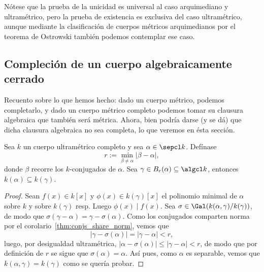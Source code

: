 \documentclass[teoria-numeros.tex]{subfiles}
\begin{document}
Nótese que la prueba de la unicidad es universal al caso arquimediano y ultramétrico, pero la prueba de existencia es exclusiva del caso ultramétrico,
aunque mediante la clasificación de cuerpos métricos arquimedianos por el teorema de Ostrowski también podemos contemplar ese caso.

\subsection{Compleción de un cuerpo algebraicamente cerrado}
Recuento sobre lo que hemos hecho: dado un cuerpo métrico, podemos completarlo, y dado un cuerpo métrico completo podemos tomar su clausura algebraica que
también será métrica. Ahora, bien podría darse (y se dá) que dicha clausura algebraica no sea completa, lo que veremos en ésta sección.

\begin{thm}
	Sea $k$ un cuerpo ultramétrico completo y sea $\alpha \in \sepcl k$. Defínase
	$$ r := \min_{\beta\ne\alpha} |\beta - \alpha|, $$
	donde $\beta$ recorre los $k$-conjugados de $\alpha$.
	Sea $\gamma \in B_r(\alpha) \subseteq \algcl k$, entonces $k(\alpha) \subseteq k(\gamma)$.
\end{thm}
\begin{proof}
	Sean $f(x) \in k[x]$ y $\phi(x) \in k(\gamma)[x]$ el polinomio minimal de $\alpha$ sobre $k$ y sobre $k(\gamma)$ resp.
	Luego $\phi(x) \mid f(x)$. Sea $\sigma \in \Gal( k(\alpha, \gamma) / k(\gamma) )$, de modo que $\sigma(\gamma - \alpha) = \gamma - \sigma(\alpha)$.
	Como los conjugados comparten norma por el corolario~\ref{thm:conjs_share_norm}, vemos que
	$$ |\gamma - \sigma(\alpha)| = |\gamma - \alpha| < r, $$
	luego, por desigualdad ultramétrica, $|\alpha - \sigma(\alpha)| \le |\gamma - \alpha| < r$,
	de modo que por definición de $r$ se sigue que $\sigma(\alpha) = \alpha$.
	Así pues, como $\alpha$ es separable, vemos que $k(\alpha, \gamma) = k(\gamma)$ como se quería probar.
\end{proof}

\end{document}
